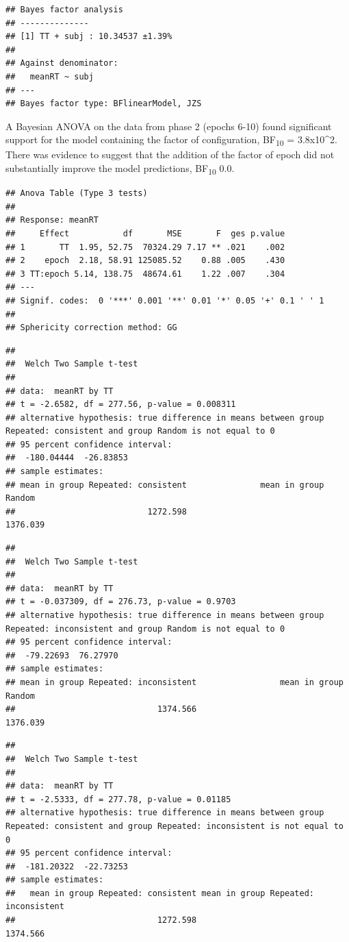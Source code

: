 \documentclass[
  man]{apa7}
\begin{document}
\begin{verbatim}
## Bayes factor analysis
## --------------
## [1] TT + subj : 10.34537 ±1.39%
## 
## Against denominator:
##   meanRT ~ subj 
## ---
## Bayes factor type: BFlinearModel, JZS
\end{verbatim}

A Bayesian ANOVA on the data from phase 2 (epochs 6-10) found significant support for the model containing the factor of configuration, BF\textsubscript{10} = 3.8x10\^{}2. There was evidence to suggest that the addition of the factor of epoch did not substantially improve the model predictions, BF\textsubscript{10} 0.0.

\begin{verbatim}
## Anova Table (Type 3 tests)
## 
## Response: meanRT
##     Effect           df       MSE       F  ges p.value
## 1       TT  1.95, 52.75  70324.29 7.17 ** .021    .002
## 2    epoch  2.18, 58.91 125085.52    0.88 .005    .430
## 3 TT:epoch 5.14, 138.75  48674.61    1.22 .007    .304
## ---
## Signif. codes:  0 '***' 0.001 '**' 0.01 '*' 0.05 '+' 0.1 ' ' 1
## 
## Sphericity correction method: GG
\end{verbatim}

\begin{verbatim}
## 
##  Welch Two Sample t-test
## 
## data:  meanRT by TT
## t = -2.6582, df = 277.56, p-value = 0.008311
## alternative hypothesis: true difference in means between group Repeated: consistent and group Random is not equal to 0
## 95 percent confidence interval:
##  -180.04444  -26.83853
## sample estimates:
## mean in group Repeated: consistent               mean in group Random 
##                           1272.598                           1376.039
\end{verbatim}

\begin{verbatim}
## 
##  Welch Two Sample t-test
## 
## data:  meanRT by TT
## t = -0.037309, df = 276.73, p-value = 0.9703
## alternative hypothesis: true difference in means between group Repeated: inconsistent and group Random is not equal to 0
## 95 percent confidence interval:
##  -79.22693  76.27970
## sample estimates:
## mean in group Repeated: inconsistent                 mean in group Random 
##                             1374.566                             1376.039
\end{verbatim}

\begin{verbatim}
## 
##  Welch Two Sample t-test
## 
## data:  meanRT by TT
## t = -2.5333, df = 277.78, p-value = 0.01185
## alternative hypothesis: true difference in means between group Repeated: consistent and group Repeated: inconsistent is not equal to 0
## 95 percent confidence interval:
##  -181.20322  -22.73253
## sample estimates:
##   mean in group Repeated: consistent mean in group Repeated: inconsistent 
##                             1272.598                             1374.566
\end{verbatim}
\end{document}
